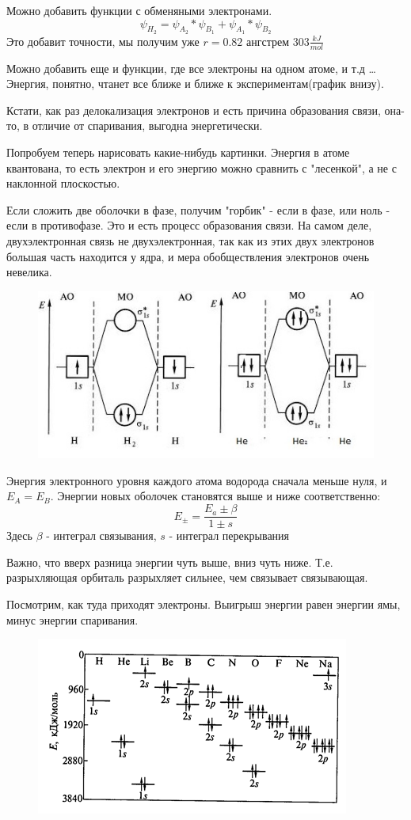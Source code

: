 \documentclass[11pt]{article}
\begin{document}
Можно добавить функции с обменяными электронами.
$$\psi_{H_2} = \psi_{A_2}*\psi_{B_1} + \psi_{A_1}*\psi_{B_2} $$
 Это добавит точности, мы получим уже $r=0.82$ ангстрем $303 \frac{kJ}{mol}$

Можно добавить еще и функции, где все электроны на одном атоме, и т.д \ldots Энергия, понятно, чтанет все ближе и ближе к экспериментам(график внизу).

Кстати, как раз делокализация электронов и есть причина образования связи, она-то, в отличие от спаривания, выгодна энергетически.

Попробуем теперь нарисовать какие-нибудь картинки. Энергия в атоме квантована, то есть электрон и его энергию можно сравнить с "лесенкой",  а не с наклонной плоскостью.

Если сложить две оболочки в фазе, получим "горбик" - если в фазе, или ноль - если в противофазе. Это и есть процесс образования связи. На самом деле, двухэлектронная связь не двухэлектронная, так как из этих двух электронов большая часть находится у ядра, и мера обобществления электронов очень невелика. 
\begin{figure}[htp]
\centering
\includegraphics[scale=1.00]{mo.jpg}
\end{figure}
Энергия электронного уровня каждого атома водорода сначала меньше нуля, и $E_A = E_B$. Энергии новых оболочек становятся выше и ниже соответственно:
$$E_{\pm} = \frac{E_a \pm \beta}{1\pm s}$$
Здесь $\beta$ - интеграл связывания, $s$ - интеграл перекрывания

Важно, что вверх разница энергии чуть выше, вниз чуть ниже. Т.е. разрыхляющая орбиталь разрыхляет сильнее, чем связывает связывающая.

Посмотрим, как туда приходят электроны. Выигрыш энергии равен энергии ямы, минус энергии спаривания.


\begin{figure}[htp]
\centering
\includegraphics[scale=1.00]{graph.png}
\end{figure}
\end{document}
